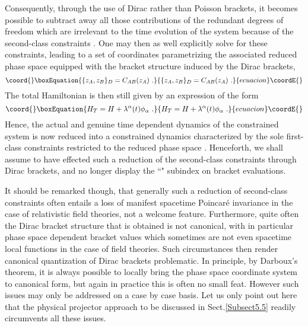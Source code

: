 \documentclass[a4paper,11pt]{article}
\begin{document}
Consequently, through the use of Dirac rather than Poisson brackets,
it becomes possible to subtract away all those contributions of the
redundant degrees of freedom which are irrelevant to the time evolution
of the system because of the second-class constraints \coordHE{}.
One may then as well explicitly solve for these constraints, leading
to a set of coordinates \coordHE{} parametrizing the associated reduced phase 
space equipped with the bracket structure induced by the Dirac brackets,
\begin{equation}\coord{}\boxEquation{
\{z_A,z_B\}_D=C_{AB}(z_A)\ .
}{
\{z_A,z_B\}_D=C_{AB}(z_A)\ .
}{ecuacion}\coordE{}\end{equation}
The total Hamiltonian is then still given by an expression of the form
\begin{equation}\coord{}\boxEquation{
H_T=H+\lambda^\alpha(t)\phi_\alpha\ .
}{
H_T=H+\lambda^\alpha(t)\phi_\alpha\ .
}{ecuacion}\coordE{}\end{equation}
Hence, the actual and genuine time dependent dynamics of the constrained
system is now reduced into a constrained dynamics characterized by the sole
first-class constraints \myHighlight{$\phi_\alpha$}\coordHE{} restricted to the reduced phase space 
\coordHE{}. Henceforth, we shall assume to have effected such a reduction
of the second-class constraints through Dirac brackets, and no longer display
the ``\coordHE{}" subindex on bracket evaluations.

It should be remarked though, that generally such a reduction of second-class
constraints often entails a loss of manifest spacetime Poincar\'e invariance
in the case of relativistic field theories, not a welcome feature.
Furthermore, quite often the Dirac bracket structure that is obtained is
not canonical, with in particular phase space dependent bracket values
\coordHE{} which sometimes are not even spacetime local functions
in the case of field theories. Such circumstances then render
canonical quantization of Dirac brackets problematic. In principle, by
Darboux's theorem, it is always possible to locally bring the phase space
coordinate system to canonical form, but again in practice this is often no
small feat. However such issues may only be addressed on a case by case
basis. Let us only point out here that the physical projector approach
to be discussed in Sect.\ref{Subsect5.5} readily circumvents all these issues.
\end{document}
